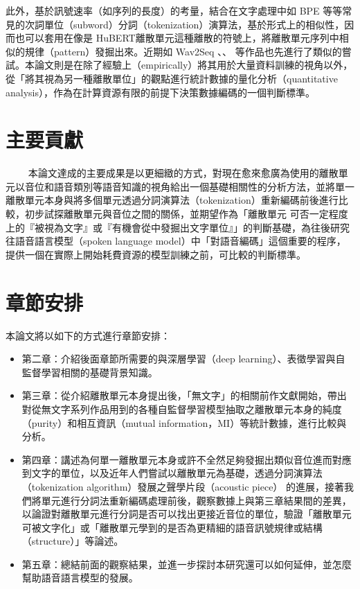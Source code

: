 此外，基於訊號速率（如序列的長度）的考量，結合在文字處理中如 BPE 等等常見的次詞單位（subword）分詞（tokenization）演算法，基於形式上的相似性，因而也可以套用在像是 HuBERT離散單元這種離散的符號上，將離散單元序列中相似的規律（pattern）發掘出來。近期如 Wav2Seq \cite{wu2023wav2seq}、\cite{ren2022speech}、\cite{chang2024exploring} 等作品也先進行了類似的嘗試。本論文則是在除了經驗上（empirically）將其用於大量資料訓練的視角以外，從「將其視為另一種離散單位」的觀點進行統計數據的量化分析（quantitative analysis），作為在計算資源有限的前提下決策數據編碼的一個判斷標準。

\section{主要貢獻}
　　
本論文達成的主要成果是以更細緻的方式，對現在愈來愈廣為使用的離散單元以音位和語音類別等語音知識的視角給出一個基礎相關性的分析方法，並將單一離散單元本身與將多個單元透過分詞演算法（tokenization）重新編碼前後進行比較，初步試探離散單元與音位之間的關係，並期望作為「離散單元 可否一定程度上的『被視為文字』或『有機會從中發掘出文字單位』」的判斷基礎，為往後研究往語音語言模型（spoken language model）中「對語音編碼」這個重要的程序，提供一個在實際上開始耗費資源的模型訓練之前，可比較的判斷標準。

\section{章節安排}

本論文將以如下的方式進行章節安排：

\begin{itemize}
  \itemsep -2pt %
  \item  第二章：介紹後面章節所需要的與深層學習（deep learning）、表徵學習與自監督學習相關的基礎背景知識。
  \item  第三章：從介紹離散單元本身提出後，「無文字」的相關前作文獻開始，帶出對從無文字系列作品用到的各種自監督學習模型抽取之離散單元本身的純度（purity）和相互資訊（mutual information，MI）等統計數據，進行比較與分析。
  \item  第四章：講述為何單一離散單元本身或許不全然足夠發掘出類似音位進而對應到文字的單位，以及近年人們嘗試以離散單元為基礎，透過分詞演算法（tokenization algorithm）發展之聲學片段（acoustic piece） 的進展，接著我們將單元進行分詞法重新編碼處理前後，觀察數據上與第三章結果間的差異，以論證對離散單元進行分詞是否可以找出更接近音位的單位，驗證「離散單元可被文字化」或「離散單元學到的是否為更精細的語音訊號規律或結構（structure）」等論述。
  \item  第五章：總結前面的觀察結果，並進一步探討本研究還可以如何延伸，並怎麼幫助語音語言模型的發展。
\end{itemize}
